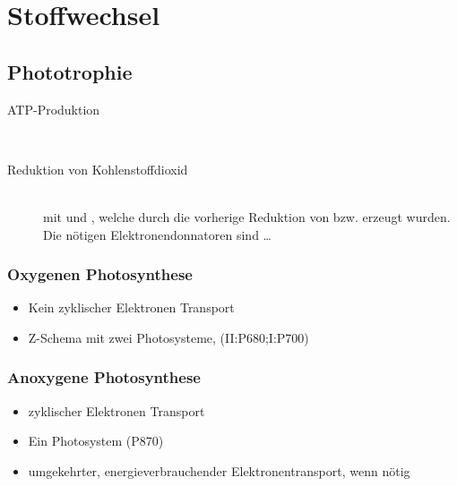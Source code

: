 \section{Stoffwechsel}
\subsection{Phototrophie}
\begin{description}
	\item[ATP-Produktion]	\hfill \\
	\item[Reduktion von Kohlenstoffdioxid]	\hfill	\\
		mit  und ,
		welche durch die vorherige Reduktion von  bzw.  erzeugt wurden.
		Die nötigen Elektronendonnatoren sind \ldots
\end{description}

\subsubsection{Oxygenen Photosynthese}
	\begin{itemize}
		\item Kein zyklischer Elektronen Transport
		\item Z-Schema mit zwei Photosysteme, (II:P680;I:P700)
	\end{itemize}

\subsubsection{Anoxygene Photosynthese}
	\begin{itemize}
		\item zyklischer Elektronen Transport
		\item Ein Photosystem (P870)
		\item umgekehrter, energieverbrauchender Elektronentransport,
			wenn  nötig
	\end{itemize}
